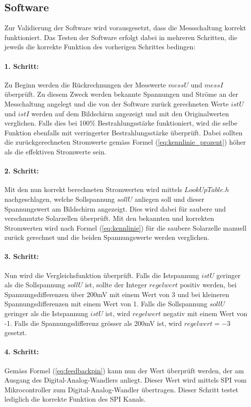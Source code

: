 \subsection{Software}
Zur Validierung der Software wird vorausgesetzt, dass die Messschaltung korrekt funktioniert. Das Testen der Software erfolgt dabei in mehreren Schritten, die jeweils die korrekte Funktion des vorherigen Schrittes bedingen:

\paragraph{1. Schritt:}
Zu Beginn werden die Rückrechnungen der Messwerte $messU$ und $messI$ überprüft. Zu diesem Zweck werden bekannte Spannungen und Ströme an der Messchaltung angelegt und die von der Software zurück gerechneten Werte $istU$ und $istI$ werden auf dem Bildschirm angezeigt und mit den Originalwerten verglichen. Falls dies bei 100\% Bestrahlungsstärke funktioniert, wird die selbe Funktion ebenfalls mit verringerter Bestrahlungsstärke überprüft. Dabei sollten die zurückgerechneten Stromwerte gemäss Formel (\ref{eq:kennlinie_prozent}) höher als die effektiven Stromwerte sein.

\paragraph{2. Schritt:}
Mit den nun korrekt berechneten Stromwerten wird mittels $LookUpTable.h$ nachgeschlagen, welche Sollspannung $sollU$ anliegen soll und dieser Spannungswert am Bildschirm angezeigt. Dies wird dabei für saubere und verschmutzte Solarzellen überprüft. Mit den bekannten und korrekten Stromwerten wird nach Formel (\ref{eq:kennlinie}) für die saubere Solarzelle manuell zurück gerechnet und die beiden Spannungswerte werden verglichen.

\paragraph{3. Schritt:}
Nun wird die Vergleichsfunktion überprüft. Falls die Istspannung $istU$ geringer als die Sollspannung $sollU$ ist, sollte der Integer $regelwert$ positiv werden, bei Spannungsdifferenzen über 200mV mit einem Wert von 3 und bei kleineren Spannungsdifferenzen mit einem Wert von 1. Falls die Sollspannung $sollU$ geringer als die Istspannung $istU$ ist, wird $regelwert$ negativ mit einem Wert von -1. Falls die Spannungsdifferenz grösser als 200mV ist, wird $regelwert=-3$ gesetzt.

\paragraph{4. Schritt:}
Gemäss Formel (\ref{eq:feedbackpin}) kann nun der Wert überprüft werden, der am Ausgang des Digital-Analog-Wand\-lers anliegt. Dieser Wert wird mittels SPI vom Mikrocontroller zum Digital-Analog-Wand\-ler übertragen. Dieser Schritt testet lediglich die korrekte Funktion des SPI Kanals.